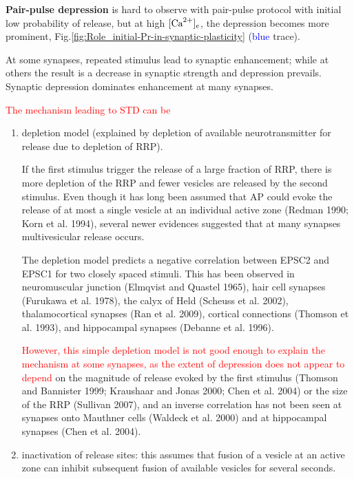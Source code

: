   {\bf Pair-pulse depression} is hard to observe with pair-pulse protocol with
  initial low probability of release, but at high $[{\text{Ca}^{2+}}]_e$, the depression
  becomes more prominent,
  Fig.\ref{fig:Role_initial-Pr-in-synaptic-plasticity} (\textcolor{blue}{blue}
  trace).

  At some synapses, repeated stimulus lead to synaptic enhancement; while
  at others the result is a decrease in synaptic strength and depression
  prevails. Synaptic depression dominates enhancement at many synapses.
  
\textcolor{red}{ The mechanism leading to STD can be} 
  \begin{enumerate}
    \item depletion model (explained by depletion of available neurotransmitter
    for release due to depletion of RRP). 
    
    If the first stimulus trigger the release of a large fraction of RRP, there
    is more depletion of the RRP and fewer vesicles are released by the second
    stimulus. Even though it has long been assumed that AP could evoke the
    release of at most a single vesicle at an individual active zone (Redman
    1990; Korn et al. 1994), several newer evidences suggested that at many
    synapses multivesicular release occurs.
       
The depletion model predicts a negative correlation between EPSC2 and EPSC1 for
two closely spaced stimuli. This has been observed in neuromuscular junction
(Elmqvist and Quastel 1965), hair cell synapses (Furukawa et al. 1978), the
calyx of Held (Scheuss et al. 2002), thalamocortical synapses (Ran et al. 2009),
cortical connections (Thomson et al. 1993), and hippocampal synapses (Debanne et
al. 1996). 


\textcolor{red}{However, this simple depletion model is not good enough to
explain the mechanism at some synapses, as the extent of depression does not
appear to depend} on the magnitude of release evoked by the first stimulus (Thomson and Bannister 1999;
Kraushaar and Jonas 2000; Chen et al. 2004) or the size of the RRP (Sullivan
2007), and an inverse correlation has not been seen at synapses onto Mauthner
cells (Waldeck et al. 2000) and at hippocampal synapses (Chen et al. 2004).

    \item inactivation of release sites: this assumes that fusion of a vesicle
    at an active zone can inhibit subsequent fusion of available vesicles for
    several seconds.
     

\end{enumerate}
